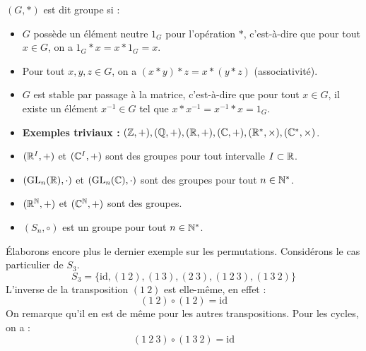 \documentclass[11pt,a4paper]{report}
\begin{document}
\MakeSwissCover



\begin{definition}
    $(G, *)$ est dit groupe si :
    \begin{itemize}
        \item $G$ possède un élément neutre $1_G$ pour l'opération $*$, c'est-à-dire que pour tout $x \in G$, on a $1_G * x = x * 1_G = x$.
        \item Pour tout $x,y,z \in G$, on a $(x * y) * z = x * (y * z)$ (associativité).
        \item $G$ est stable par passage à la matrice, c'est-à-dire que pour tout $x \in G$, il existe un élément $x^{-1} \in G$ tel que $x * x^{-1} = x^{-1} * x = 1_G$.
    \end{itemize}
\end{definition}

\begin{example}
    \begin{itemize}
        \item \textbf{Exemples triviaux :} $(\mathbb{Z},+), (\mathbb{Q},+), (\mathbb{R},+), (\mathbb{C},+), (\mathbb{R}^*,\times), (\mathbb{C}^*,\times)$.
        \item $(\mathbb{R}^I,+)$ et $(\mathbb{C}^I,+)$ sont des groupes pour tout intervalle $I \subset \mathbb{R}$.
        \item $(\mathrm{GL}_n(\mathbb{R}),\cdot)$ et $(\mathrm{GL}_n(\mathbb{C}),\cdot)$ sont des groupes pour tout $n \in \mathbb{N}^*$.
        \item $(\mathbb{R}^{\mathbb{N}}, +)$ et $(\mathbb{C}^{\mathbb{N}}, +)$ sont des groupes.
        \item $(S_n, \circ)$ est un groupe pour tout $n \in \mathbb{N}^*$.
    \end{itemize}
\end{example}

Élaborons encore plus le dernier exemple sur les permutations. Considérons le cas particulier de $S_3$.
$$S_3 = \{ \text{id}, (1\ 2), (1\ 3), (2\ 3), (1\ 2\ 3), (1\ 3\ 2) \}$$
L'inverse de la transposition $(1\ 2)$ est elle-même, en effet :
$$(1\ 2) \circ (1\ 2) = \text{id}$$
On remarque qu'il en est de même pour les autres transpositions. Pour les cycles, on a :
$$(1\ 2\ 3) \circ (1\ 3\ 2) = \text{id}$$
\end{document}
